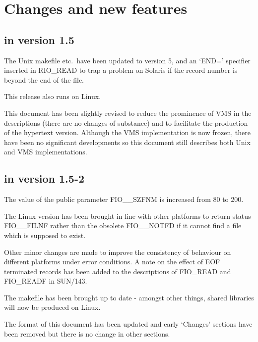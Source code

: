 \documentclass[twoside,11pt,nolof]{starlink}
\begin{document}
\section{Changes and new features}

\subsection{in version 1.5}
The Unix makefile etc.\ have been updated to version 5, and an `END='
specifier inserted in RIO\_READ to trap a problem on Solaris if the record
number is beyond the end of the file.

This release also runs on Linux.

This document has been slightly revised to reduce the prominence of VMS in the
descriptions (there are no changes of substance) and to facilitate the
production of the hypertext version.
Although the VMS implementation is now frozen, there have been no significant
developments so this document still describes both Unix and VMS implementations.


\subsection{in version 1.5-2}
The value of the public parameter FIO\_\_SZFNM is increased from 80 to
200.

The Linux version has been brought in line with other platforms to return
status FIO\_\_FILNF rather than the obsolete FIO\_\_NOTFD if it cannot find a
file which is supposed to exist.

Other minor changes are made to improve the consistency of behaviour
on different platforms under error conditions. A note on the effect of EOF
terminated records has been added to the descriptions of FIO\_READ and
FIO\_READF in SUN/143.


The makefile has been brought up to date - amongst other things, shared
libraries will now be produced on Linux.

The format of this document has been updated and early `Changes' sections have
been removed but there is no change in other sections.
\end{document}
